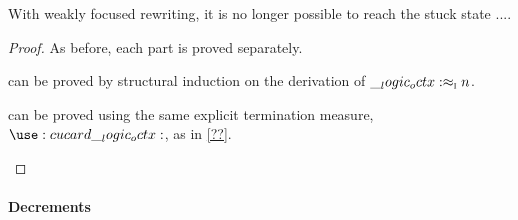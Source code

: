 With weakly focused rewriting, it is no longer possible to reach the stuck state $...$.
\smallincadequacytheorem
\begin{proof}
  As before, each part is proved separately.
  \begin{description}[
    parsep=0pt, listparindent=\parindent,
    labelsep=0.35em
  ]
  \item[Value soundness, preservation, and progress]
    can be proved by structural induction on the derivation of $\__logic_octx: \approx\sb{\text{\normalfont\scshape i}} n$.
  \item[Termination]
    can be proved using the same explicit termination measure, $\card{\octx}$, as in \cref{??}.
  \qedhere
  \end{description}
\end{proof}


\paragraph*{Decrements}


